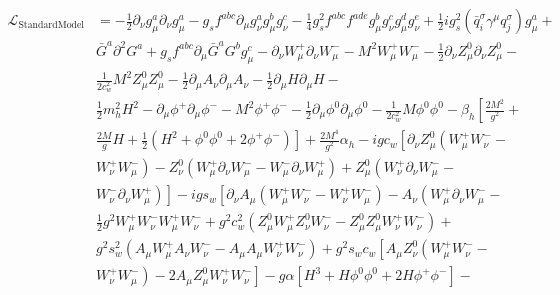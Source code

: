 \documentclass[lang=cn,newtx,10pt,scheme=chinese,thmcnt=section]{elegantbook}
\begin{document}
\begin{equation}
	\begin{aligned}
		\mathcal{L}_{\mathrm{StandardModel}}&=-\frac{1}{2} \partial_{\nu} g_{\mu}^{a} \partial_{\nu} g_{\mu}^{a}-g_{s} f^{a b c} \partial_{\mu} g_{\nu}^{a} g_{\mu}^{b} g_{\nu}^{c}-\frac{1}{4} g_{s}^{2} f^{a b c} f^{a d e} g_{\mu}^{b} g_{\nu}^{c} g_{\mu}^{d} g_{\nu}^{e}+\frac{1}{2} i g_{s}^{2}\left(\bar{q}_{i}^{\sigma} \gamma^{\mu} q_{j}^{\sigma}\right) g_{\mu}^{a}+\\&\bar{G}^{a} \partial^{2} G^{a}+g_{s} f^{a b c} \partial_{\mu} \bar{G}^{a} G^{b} g_{\mu}^{c}-\partial_{\nu} W_{\mu}^{+} \partial_{\nu} W_{\mu}^{-}-M^{2} W_{\mu}^{+} W_{\mu}^{-}-\frac{1}{2} \partial_{\nu} Z_{\mu}^{0} \partial_{\nu} Z_{\mu}^{0}-\\&\frac{1}{2 c_{w}^{2}} M^{2} Z_{\mu}^{0} Z_{\mu}^{0}-\frac{1}{2} \partial_{\mu} A_{\nu} \partial_{\mu} A_{\nu}-\frac{1}{2} \partial_{\mu} H \partial_{\mu} H-\\&\frac{1}{2} m_{h}^{2} H^{2}-\partial_{\mu} \phi^{+} \partial_{\mu} \phi^{-}-M^{2} \phi^{+} \phi^{-}-\frac{1}{2} \partial_{\mu} \phi^{0} \partial_{\mu} \phi^{0}-\frac{1}{2 c_{w}^{2}} M \phi^{0} \phi^{0}-\beta_{h}\left[\frac{2 M^{2}}{g^{2}}+\right.\\&\left.\frac{2 M}{g} H+\frac{1}{2}\left(H^{2}+\phi^{0} \phi^{0}+2 \phi^{+} \phi^{-}\right)\right]+\frac{2 M^{4}}{g^{2}} \alpha_{h}-i g c_{w}\left[\partial_{\nu} Z_{\mu}^{0}\left(W_{\mu}^{+} W_{\nu}^{-}-\right.\right.\\&\left.W_{\nu}^{+} W_{\mu}^{-}\right)-Z_{\nu}^{0}\left(W_{\mu}^{+} \partial_{\nu} W_{\mu}^{-}-W_{\mu}^{-} \partial_{\nu} W_{\mu}^{+}\right)+Z_{\mu}^{0}\left(W_{\nu}^{+} \partial_{\nu} W_{\mu}^{-}-\right.\\&\left.\left.W_{\nu}^{-} \partial_{\nu} W_{\mu}^{+}\right)\right]-i g s_{w}\left[\partial_{\nu} A_{\mu}\left(W_{\mu}^{+} W_{\nu}^{-}-W_{\nu}^{+} W_{\mu}^{-}\right)-A_{\nu}\left(W_{\mu}^{+} \partial_{\nu} W_{\mu}^{-}-\right.\right.\\
		&\frac{1}{2} g^{2} W_{\mu}^{+} W_{\nu}^{-} W_{\mu}^{+} W_{\nu}^{-}+g^{2} c_{w}^{2}\left(Z_{\mu}^{0} W_{\mu}^{+} Z_{\nu}^{0} W_{\nu}^{-}-Z_{\mu}^{0} Z_{\mu}^{0} W_{\nu}^{+} W_{\nu}^{-}\right)+\\
		&g^{2} s_{w}^{2}\left(A_{\mu} W_{\mu}^{+} A_{\nu} W_{\nu}^{-}-A_{\mu} A_{\mu} W_{\nu}^{+} W_{\nu}^{-}\right)+g^{2} s_{w} c_{w}\left[A_{\mu} Z_{\nu}^{0}\left(W_{\mu}^{+} W_{\nu}^{-}-\right.\right.\\
		&\left.\left.W_{\nu}^{+} W_{\mu}^{-}\right)-2 A_{\mu} Z_{\mu}^{0} W_{\nu}^{+} W_{\nu}^{-}\right]-g \alpha\left[H^{3}+H \phi^{0} \phi^{0}+2 H \phi^{+} \phi^{-}\right]-\\

\end{aligned}
\end{equation}
\end{document}

